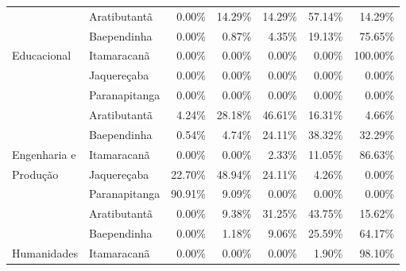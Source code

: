 \begin{table}[h]
\begin{tabular}{ll rrrrr}
						  & Aratibutantã            &               0.00\% &        14.29\% &       14.29\% &      57.14\% &            14.29\% \\ 
                          & Baependinha             &               0.00\% &         0.87\% &        4.35\% &      19.13\% &            75.65\% \\ 
   Educacional            & Itamaracanã             &               0.00\% &         0.00\% &        0.00\% &       0.00\% &           100.00\% \\ 
                          & Jaquereçaba             &               0.00\% &         0.00\% &        0.00\% &       0.00\% &             0.00\% \\ 
                          & Paranapitanga           &               0.00\% &         0.00\% &        0.00\% &       0.00\% &             0.00\% \\ 
 \midrule{}                                                                                                                          
						  & Aratibutantã            &               4.24\% &        28.18\% &       46.61\% &      16.31\% &             4.66\% \\ 
                          & Baependinha             &               0.54\% &         4.74\% &       24.11\% &      38.32\% &            32.29\% \\ 
  Engenharia e            & Itamaracanã             &               0.00\% &         0.00\% &        2.33\% &      11.05\% &            86.63\% \\ 
  Produção                & Jaquereçaba             &              22.70\% &        48.94\% &       24.11\% &       4.26\% &             0.00\% \\ 
                          & Paranapitanga           &              90.91\% &         9.09\% &        0.00\% &       0.00\% &             0.00\% \\ 
 \midrule{}                                                                                                                          
						  & Aratibutantã            &               0.00\% &         9.38\% &       31.25\% &      43.75\% &            15.62\% \\ 
                          & Baependinha             &               0.00\% &         1.18\% &        9.06\% &      25.59\% &            64.17\% \\ 
  Humanidades             & Itamaracanã             &               0.00\% &         0.00\% &        0.00\% &       1.90\% &            98.10\% \\ 

\end{tabular}
\end{table}
